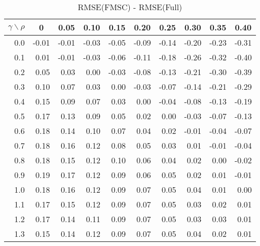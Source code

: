 \documentclass[12pt]{article}
\begin{document}
%
\begin{table}[!tbp]
\caption{RMSE(FMSC) - RMSE(Full)}
 \begin{center}
 \begin{tabular}{r|rrrrrrrrr}\hline\hline
\multicolumn{1}{c|}{$\gamma\backslash\rho$}&\multicolumn{1}{c}{0}&\multicolumn{1}{c}{0.05}&\multicolumn{1}{c}{0.10}&\multicolumn{1}{c}{0.15}&\multicolumn{1}{c}{0.20}&\multicolumn{1}{c}{0.25}&\multicolumn{1}{c}{0.30}&\multicolumn{1}{c}{0.35}&\multicolumn{1}{c}{0.40}\tabularnewline
\hline

0.0&-0.01&-0.01&-0.03&-0.05&-0.09&-0.14&-0.20&-0.23&-0.31\tabularnewline
0.1& 0.01&-0.01&-0.03&-0.06&-0.11&-0.18&-0.26&-0.32&-0.40\tabularnewline
0.2& 0.05& 0.03& 0.00&-0.03&-0.08&-0.13&-0.21&-0.30&-0.39\tabularnewline
0.3& 0.10& 0.07& 0.03& 0.00&-0.03&-0.07&-0.14&-0.21&-0.29\tabularnewline
0.4& 0.15& 0.09& 0.07& 0.03& 0.00&-0.04&-0.08&-0.13&-0.19\tabularnewline
0.5& 0.17& 0.13& 0.09& 0.05& 0.02& 0.00&-0.03&-0.07&-0.13\tabularnewline
0.6& 0.18& 0.14& 0.10& 0.07& 0.04& 0.02&-0.01&-0.04&-0.07\tabularnewline
0.7& 0.18& 0.16& 0.12& 0.08& 0.05& 0.03& 0.01&-0.01&-0.04\tabularnewline
0.8& 0.18& 0.15& 0.12& 0.10& 0.06& 0.04& 0.02& 0.00&-0.02\tabularnewline
0.9& 0.19& 0.17& 0.12& 0.09& 0.06& 0.05& 0.02& 0.01&-0.01\tabularnewline
1.0& 0.18& 0.16& 0.12& 0.09& 0.07& 0.05& 0.04& 0.01& 0.00\tabularnewline
1.1& 0.17& 0.15& 0.12& 0.09& 0.07& 0.05& 0.03& 0.02& 0.01\tabularnewline
1.2& 0.17& 0.14& 0.11& 0.09& 0.07& 0.05& 0.03& 0.03& 0.01\tabularnewline
1.3& 0.15& 0.14& 0.12& 0.09& 0.07& 0.05& 0.04& 0.02& 0.01\tabularnewline
\hline
\end{tabular}

\end{center}

\end{table}
\end{document}
